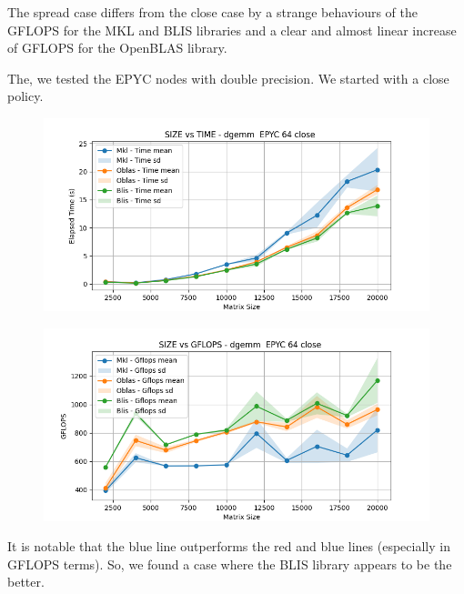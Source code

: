 \documentclass[12pt, titlepage]{report}
\begin{document}
The spread case differs from the close case by a strange behaviours of the GFLOPS for the MKL and BLIS libraries and a clear and almost linear increase of GFLOPS for the OpenBLAS library. 

The, we tested the EPYC nodes with double precision. We started with a close policy.
\begin{figure}[H]
    \centering
    \includegraphics[width=\textwidth]{EPYC 64/dgemm__EPYC_64_close_time.png}
\end{figure}

\begin{figure}[H]
    \centering
    \includegraphics[width=\textwidth]{EPYC 64/dgemm__EPYC_64_close_gflops.png}
\end{figure}

It is notable that the blue line outperforms the red and blue lines (especially in GFLOPS terms). So, we found a case where the BLIS library appears to be the better. 
\end{document}
